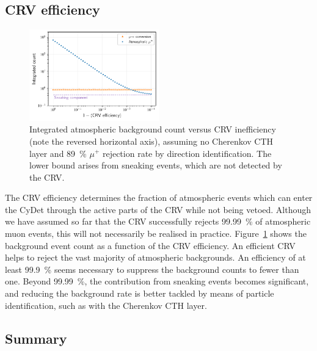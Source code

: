 \subsection{CRV efficiency}

\begin{figure}
    \centering
    \includegraphics[width=0.5\textwidth]{chapter6/bg_count_vs_crv_efficiency.pdf}
    \caption[Integrated atmospheric background count versus CRV inefficiency]{ Integrated atmospheric background count versus CRV inefficiency
        (note the reversed horizontal axis), assuming no Cherenkov CTH layer and
        \SI{89}{\percent} $\mu^+$ rejection rate by direction identification.
        The lower bound arises from sneaking events, which are not detected by
        the CRV. 
        }
    \label{fig:bg_count_vs_crv_efficiency}
\end{figure}

The CRV efficiency determines the fraction of atmospheric events which can enter
the CyDet through the active parts of the CRV while not being vetoed. Although
we have assumed so far that the CRV successfully rejects \SI{99.99}{\percent} of
atmospheric muon events, this will not necessarily be realised in practice.
Figure~\ref{fig:bg_count_vs_crv_efficiency} shows the background event count as
a function of the CRV efficiency. An efficient CRV helps to reject the vast
majority of atmospheric backgrounds. An efficiency of at least
\SI{99.9}{\percent} seems necessary to suppress the background counts to fewer
than one. Beyond \SI{99.99}{\percent}, the contribution from sneaking events
becomes significant, and reducing the background rate is better tackled by means
of particle identification, such as with the Cherenkov CTH layer.

\subsection{Summary}

